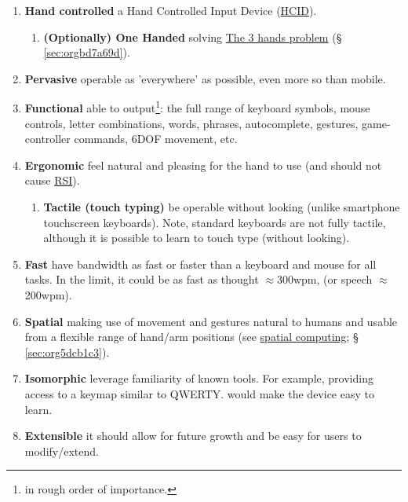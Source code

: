 \documentclass[logo,bsc,singlespacing,parskip]{infthesis}
\begin{document}
\begin{enumerate}
\item \textbf{Hand controlled} a Hand Controlled Input Device (\hyperref[org30e2275]{HCID}).

\begin{enumerate}
\item \textbf{(Optionally) One Handed} solving \hyperref[sec:orgbd7a69d]{The 3 hands problem} (§ \ref{sec:orgbd7a69d}).
\end{enumerate}

\item \textbf{Pervasive} operable as 'everywhere' as possible, even more so than mobile.

\item \textbf{Functional} able to output\footnote{in rough order of importance.}: the full range of keyboard symbols, mouse controls, letter combinations, words, phrases, autocomplete, gestures, game-controller commands, 6DOF movement, etc.

\item \textbf{Ergonomic} feel natural and pleasing for the hand to use (and should not cause \hyperref[orgc186d45]{RSI}).

\begin{enumerate}
\item \textbf{Tactile (touch typing)} be operable without looking (unlike smartphone touchscreen keyboards). Note, standard keyboards are not fully tactile, although it is possible to learn to touch type (without looking).
\end{enumerate}

\item \textbf{Fast} have bandwidth as fast or faster than a keyboard and mouse for all tasks. In the limit, it could be as fast as thought \(\approx\)300wpm, (or speech \(\approx\)200wpm).

\item \textbf{Spatial} making use of movement and gestures natural to humans and usable from a flexible range of hand/arm positions (see \hyperref[sec:org5dcb1c3]{spatial computing}; § \ref{sec:org5dcb1c3}).

\item \textbf{Isomorphic} leverage familiarity of known tools. For example, providing access to a keymap similar to QWERTY. would make the device easy to learn.

\item \textbf{Extensible} it should allow for future growth and be easy for users to modify/extend.
\end{enumerate}
\end{document}
